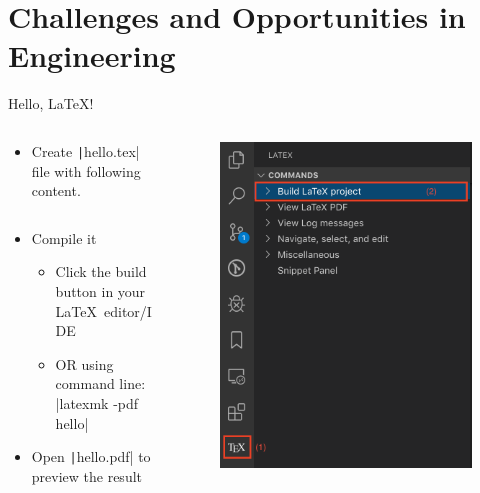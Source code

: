 \documentclass[xcolor={dvipsnames},aspectratio=169,10pt]{beamer}
\begin{document}
\section{Challenges and Opportunities in Engineering}
\begin{frame}[fragile]{Hello, \LaTeX!}
  \begin{columns}
    \begin{column}{.7\linewidth}
      \begin{itemize}
        \item Create \texttt|hello.tex| file with following content.
              \inputminted{latex}{./minted/hello.tex}
        \item Compile it
              \begin{itemize}
                \item Click the build button in your \LaTeX~editor/IDE
                \item OR using command line: \bashinline|latexmk -pdf hello|
              \end{itemize}
        \item Open \texttt|hello.pdf| to preview the result
      \end{itemize}
    \end{column}
    \begin{column}{.3\linewidth}
      \begin{figure}
        \centering
        \includegraphics[width=\linewidth]{./figs/vscode-compile-project.png}

\end{figure}
\end{column}
\end{columns}
\end{frame}
\end{document}
